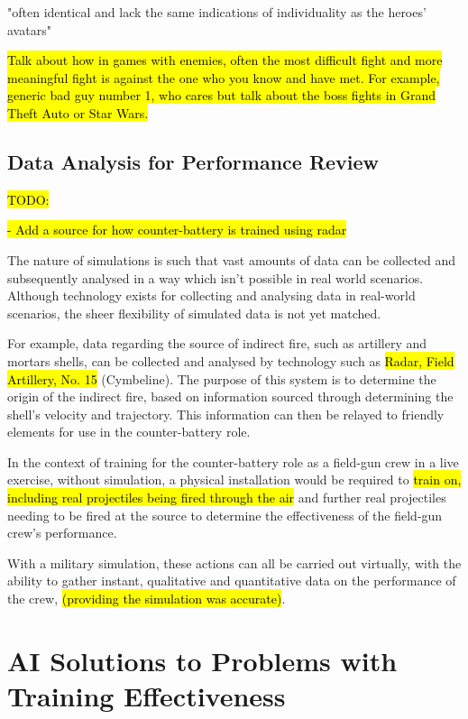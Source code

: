 \documentclass{article}
\begin{document}
"often identical and lack the same indications of individuality as
the heroes’ avatars"

\hl{Talk about how in games with enemies, often the most difficult fight and more meaningful fight is against the one who you know and have met.
For example, generic bad guy number 1, who cares but talk about the boss fights in Grand Theft Auto or Star Wars.}



\subsection{Data Analysis for Performance Review}

\hl{TODO:} 

\hl{- Add a source for how counter-battery is trained using radar}

The nature of simulations is such that vast amounts of data can be collected and subsequently analysed in a way which isn't possible in real world scenarios. Although technology exists for collecting and analysing data in real-world scenarios, the sheer flexibility of simulated data is not yet matched.

For example, data regarding the source of indirect fire, such as artillery and mortars shells, can be collected and analysed by technology such as \hl{Radar, Field Artillery, No. 15} (Cymbeline). The purpose of this system is to determine the origin of the indirect fire, based on information sourced through determining the shell's velocity and trajectory. This information can then be relayed to friendly elements for use in the counter-battery role.

In the context of training for the counter-battery role as a field-gun crew in a live exercise, without simulation, a physical installation would be required to \hl{train on, including real projectiles being fired through the air} and further real projectiles needing to be fired at the source to determine the effectiveness of the field-gun crew's performance.

With a military simulation, these actions can all be carried out virtually, with the ability to gather instant, qualitative and quantitative data on the performance of the crew, \hl{(providing the simulation was accurate)}.

\section{AI Solutions to Problems with Training Effectiveness}
\end{document}
